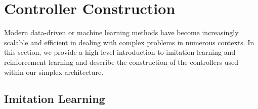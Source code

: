 \documentclass[manuscript,screen,review]{acmart}
\begin{document}



\section{Controller Construction}

Modern data-driven or machine learning methods have become increasingly scalable and efficient in dealing with complex problems in numerous contexts. In this section, we provide a high-level introduction to imitation learning and reinforcement learning and describe the construction of the controllers used within our simplex architecture.

\subsection{Imitation Learning}
\end{document}

